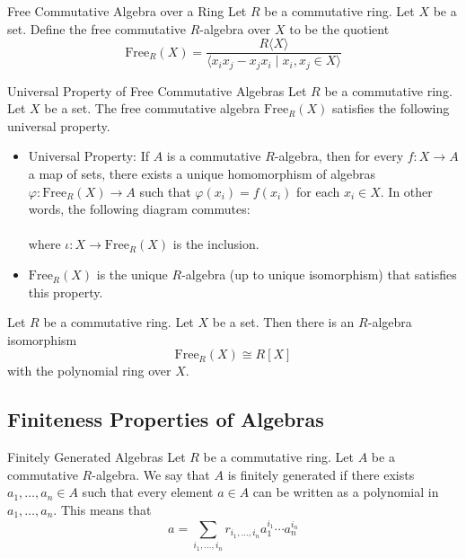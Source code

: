 \documentclass[a4paper]{article}
\begin{document}
\begin{defn}{Free Commutative Algebra over a Ring}{} Let $R$ be a commutative ring. Let $X$ be a set. Define the free commutative $R$-algebra over $X$ to be the quotient $$\text{Free}_R(X)=\frac{R\langle X\rangle}{\langle x_ix_j-x_jx_i\;|\;x_i,x_j\in X\rangle}$$
\end{defn}

\begin{prp}{Universal Property of Free Commutative Algebras}{} Let $R$ be a commutative ring. Let $X$ be a set. The free commutative algebra $\text{Free}_R(X)$ satisfies the following universal property. 
\begin{itemize}
\item Universal Property: If $A$ is a commutative $R$-algebra, then for every $f:X\to A$ a map of sets, there exists a unique homomorphism of algebras $\varphi:\text{Free}_R(X)\to A$ such that $\varphi(x_i)=f(x_i)$ for each $x_i\in X$. In other words, the following diagram commutes: \\
\\
where $\iota:X\to\text{Free}_R(X)$ is the inclusion. 
\item $\text{Free}_R(X)$ is the unique $R$-algebra (up to unique isomorphism) that satisfies this property. 
\end{itemize}
\end{prp}

\begin{prp}{}{} Let $R$ be a commutative ring. Let $X$ be a set. Then there is an $R$-algebra isomorphism $$\text{Free}_R(X)\cong R[X]$$ with the polynomial ring over $X$. 
\end{prp}

\subsection{Finiteness Properties of Algebras}
\begin{defn}{Finitely Generated Algebras}{} Let $R$ be a commutative ring. Let $A$ be a commutative $R$-algebra. We say that $A$ is finitely generated if there exists $a_1,\dots,a_n\in A$ such that every element $a\in A$ can be written as a polynomial in $a_1,\dots,a_n$. This means that $$a=\sum_{i_1,\dots,i_n}r_{i_1,\dots,i_n}a_1^{i_1}\cdots a_n^{i_n}$$
\end{defn}
\end{document}
